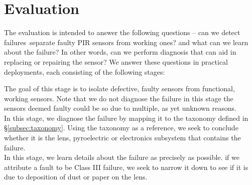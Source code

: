 

\section{Evaluation}
\label{sec:evaluation}
The evaluation is intended to answer the following questions -- \ca can we detect failures~\ie separate faulty PIR sensors from working ones? and \cb what can we learn about the failure? In other words, can we perform diagnosis that can aid in replacing or repairing the sensor? We answer these questions in practical deployments, %
each consisting of the following stages:

 The goal of this stage is to isolate defective, faulty sensors from functional, working sensors. Note that we do not diagnose the failure in this stage \ie the sensors deemed faulty could be so due to multiple, as yet unknown reasons.\\
\hspace*{2ex} In this stage, we diagnose the failure by mapping it to the taxonomy defined in \S\ref{subsec:taxonomy}. Using the taxonomy as a reference, we seek to conclude whether it is the lens, pyroelectric or electronics subsystem that contains the failure.\\
\hspace*{2ex} In this stage, we learn details about the failure as precisely as possible. \Eg if we attribute a fault to be Class III failure, we seek to narrow it down to see if it is due to deposition of dust or paper on the lens.



